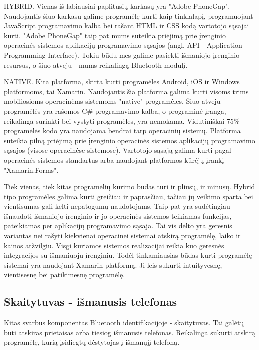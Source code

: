 \documentclass{VUMIFPSkursinis}
\begin{document}

HYBRID. Vienas iš labiausiai paplitusių karkasų yra "Adobe PhoneGap". Naudojantis šiuo karkasu galime programėlę kurti kaip tinklalapį, programuojant JavaScript programavimo kalba bei rašant HTML ir CSS kodą vartotojo sąsajai kurti. "Adobe PhoneGap" taip pat mums suteikia priėjimą prie įrenginio operacinės sistemos aplikacijų programavimo sąsajos (angl. API - Application Programming Interface). Tokiu būdu mes galime pasiekti išmaniojo įrenginio resursus, o šiuo atveju - mums reikalingą Bluetooth modulį.


NATIVE. Kita platforma, skirta kurti programėles Android, iOS ir Windows platformoms, tai Xamarin. Naudojantis šia platforma galima kurti visoms trims mobiliosioms operacinėms sistemoms "native" programėles. Šiuo atveju programėlės yra rašomos C\# programavimo kalba, o programinė įranga, reikalinga surinkti bei vystyti programėles, yra nemokama. Vidutiniškai 75\% programėlės kodo yra naudojama bendrai tarp operacinių sistemų. Platforma suteikia pilną priėjimą prie įrenginio operacinės sistemos aplikacijų programavimo sąsajos (visose operacinėse sistemose). Vartotojo sąsają galima kurti pagal operacinės sistemos standartus arba naudojant platformos kūrėjų įrankį "Xamarin.Forms".


Tiek vienas, tiek kitas programėlių kūrimo būdas turi ir pliusų, ir minusų. Hybrid tipo programėles galima kurti greičiau ir paprasčiau, tačiau jų veikimo sparta bei vientisumas gali kelti nepatogumų naudotojams. Taip pat yra sudėtingiau išnaudoti išmaniojo įrenginio ir jo operacinės sistemos teikiamas funkcijas, pateikiamas per aplikacijų programavimo sąsaja. Tai vis dėlto yra geresnis variantas nei rašyti kiekvienai operacinei sistemai atskirą programėlę, laiko ir kainos atžvilgiu. Visgi kuriamos sistemos realizacijai reikia kuo geresnės integracijos su išmaniuoju įrenginiu. Todėl tinkamiausias būdas kurti programėlę sistemai yra naudojant Xamarin platformą. Ji leis sukurti intuityvesnę, vientisesnę bei patikimesnę programėlę.

\subsection{Skaitytuvas - išmanusis telefonas}
Kitas svarbus komponentas Bluetooth identifikacijoje - skaitytuvas. Tai galėtų būti atskiras prietaisas arba tiesiog išmanusis telefonas. Reikalinga sukurti atskirą programėlę, kurią įsidiegtų dėstytojas į išmanųjį telefoną.
\end{document}
